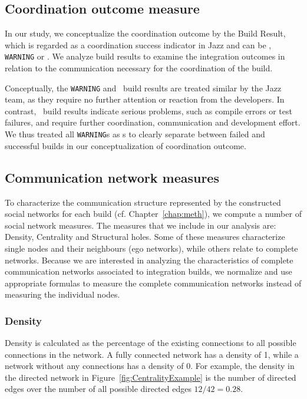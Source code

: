 \subsection{Coordination outcome measure}
In our study, we conceptualize the coordination outcome by the Build Result,
which is regarded as a coordination success indicator in Jazz and can be \error,
\texttt{WARNING} or \ok. We analyze build results to examine the integration
outcomes in relation to the communication necessary for the coordination of the
build.

Conceptually, the \texttt{WARNING} and \ok\ build results are treated similar by
the Jazz team, as they require no further attention or reaction from the
developers. In contrast, \error\ build results indicate serious problems, such as
compile errors or test failures, and require further coordination, communication
and development effort. We thus treated all \texttt{WARNING}s as \ok s to clearly
separate between failed and successful builds in our conceptualization of
coordination outcome.


\subsection{Communication network measures}
To characterize the communication structure represented by the constructed social
networks for each build (cf. Chapter~\ref{chap:meth}), we compute a number of social network measures. The
measures that we include in our analysis are: Density, Centrality and Structural
holes. Some of these measures characterize single nodes and their neighbours (ego
networks), while others relate to complete networks. Because we are interested in
analyzing the characteristics of complete communication networks associated to
integration builds, we normalize and use appropriate formulas to measure the
complete communication networks instead of measuring the individual nodes.

\subsubsection{Density}
Density is calculated as the percentage of the existing connections to all
possible connections in the network. A fully connected network has a density of
1, while a network without any connections has a density of 0. For example, the
density in the directed network in Figure~\ref{fig:CentralityExample} is
the number of directed edges over the number of all possible directed edges $12/42=0.28$.


